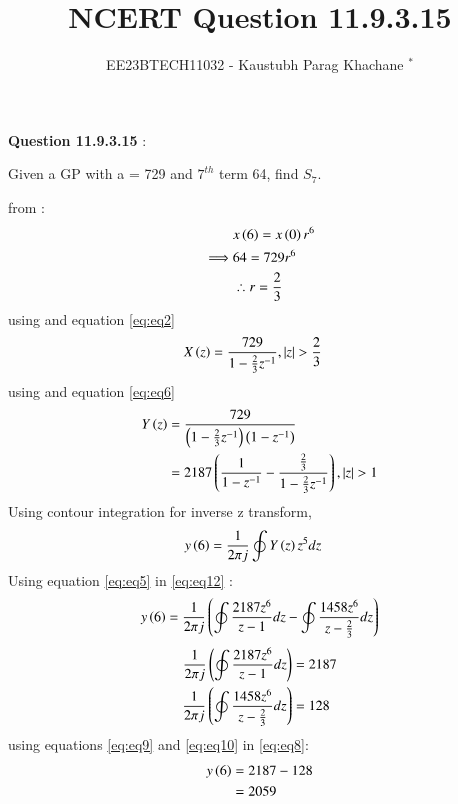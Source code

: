 \documentclass[journal,12pt,twocolumn]{IEEEtran}
\theoremstyle{remark}
\begin{document}

\vspace{3cm}

\Large\title{NCERT Question 11.9.3.15}
\large\author{EE23BTECH11032 - Kaustubh Parag Khachane $^{*}$%
}
\maketitle
\newpage
\bigskip

\renewcommand{\thefigure}{\theenumi}
\renewcommand{\thetable}{\theenumi}
\large\textbf{Question 11.9.3.15} :

Given a GP with a = 729 and $7^{th}$ term 64, find $S_7$.

\solution



from  :
\begin{align}
    &x\left(6\right) = x\left(0\right)r^6\\
    \implies &64 = 729r^6\\
    &\therefore r = \frac{2}{3}\label{eq:eq2}
\end{align}
using  and equation \eqref{eq:eq2}
\begin{align}
    &X\left(z\right) = \frac{729}{1 - \frac{2}{3}z^{-1}}\label{eq:eq6},\left\vert z\right\vert > \frac{2}{3}
\end{align}
using  and equation \eqref{eq:eq6}
\begin{align}
    Y\left(z\right) &= \frac{729}{\left(1 - \frac{2}{3}z^{-1}\right)\left(1-z^{-1}\right)}\\
    &= 2187\left(\frac{1}{1-z^{-1}} - \frac{\frac{2}{3}}{1 - \frac{2}{3}z^{-1}}\right) \label{eq:eq5},\left\vert z\right\vert  > 1
\end{align}
Using contour integration for inverse z transform,
\begin{align}
    y\left(6\right) &= \frac{1}{2\pi j}\oint Y\left(z\right) z^{5} dz \label{eq:eq12}
\end{align}
Using equation \eqref{eq:eq5} in \eqref{eq:eq12} :
\begin{align}
    y\left(6\right)= \frac{1}{2\pi j}\left(\oint\frac{2187z^{6}}{z-1}dz - \oint\frac{1458z^{6}}{z - \frac{2}{3}} dz\right) \label{eq:eq8}
\end{align}
\begin{align}
    \frac{1}{2\pi j}\left(\oint\frac{2187z^{6}}{z - 1}dz\right) &= 2187\label{eq:eq9}\\
     \frac{1}{2\pi j}\left(\oint\frac{1458z^{6}}{z - \frac{2}{3}}dz\right)  &= 128\label{eq:eq10}
     \end{align}
using equations \eqref{eq:eq9} and \eqref{eq:eq10} in \eqref{eq:eq8}:
\begin{align}
y\left(6\right) &= 2187 - 128\\
&= 2059
\end{align}
\end{document}
